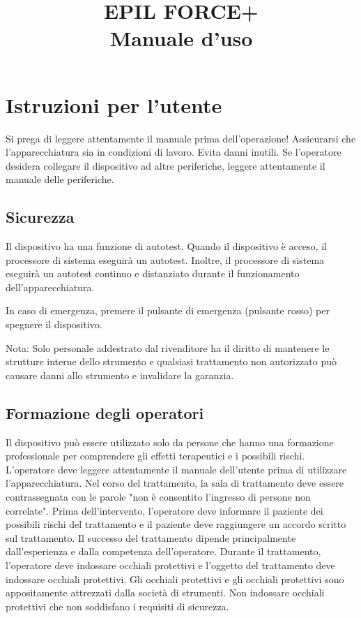 \documentclass[10pt]{article}
\title{\Huge{EPIL FORCE+\\Manuale d'uso}}
\date{}
\begin{document}
	
\maketitle

\newpage

\tableofcontents

\newpage

\section{Istruzioni per l'utente}
Si prega di leggere attentamente il manuale prima dell'operazione! Assicurarsi che l'apparecchiatura sia in condizioni di lavoro. Evita danni inutili. Se l'operatore desidera collegare il dispositivo ad altre periferiche, leggere attentamente il manuale delle periferiche.

\subsection{Sicurezza}
Il dispositivo ha una funzione di autotest. Quando il dispositivo è acceso, il processore di sistema eseguirà un autotest. Inoltre, il processore di sistema eseguirà un autotest continuo e distanziato durante il funzionamento dell'apparecchiatura.

In caso di emergenza, premere il pulsante di emergenza (pulsante rosso) per spegnere il dispositivo.

Nota: Solo personale addestrato dal rivenditore ha il diritto di mantenere le strutture interne dello strumento e qualsiasi trattamento non autorizzato può causare danni allo strumento e invalidare la garanzia.

\subsection{Formazione degli operatori}
Il dispositivo può essere utilizzato solo da persone che hanno una formazione professionale per comprendere gli effetti terapeutici e i possibili rischi. L'operatore deve leggere attentamente il manuale dell'utente prima di utilizzare l'apparecchiatura. Nel corso del trattamento, la sala di trattamento deve essere contrassegnata con le parole "non è consentito l'ingresso di persone non correlate". Prima dell'intervento, l'operatore deve informare il paziente dei possibili rischi del trattamento e il paziente deve raggiungere un accordo scritto sul trattamento. Il successo del trattamento dipende principalmente dall'esperienza e dalla competenza dell'operatore. Durante il trattamento, l'operatore deve indossare occhiali protettivi e l'oggetto del trattamento deve indossare occhiali protettivi. Gli occhiali protettivi e gli occhiali protettivi sono appositamente attrezzati dalla società di strumenti. Non indossare occhiali protettivi che non soddisfano i requisiti di sicurezza.
\end{document}
